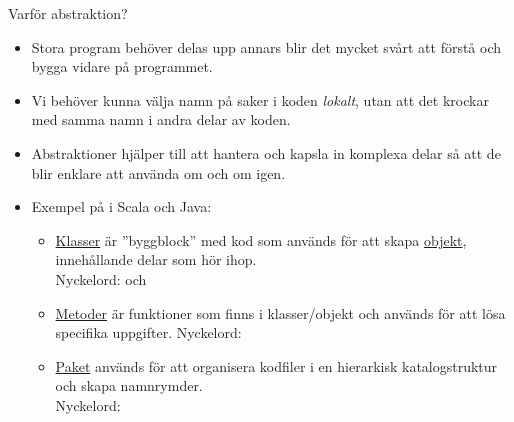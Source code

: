 \begin{Slide}{Varför abstraktion?}
\begin{itemize}
\item Stora program behöver delas upp annars blir det mycket svårt att förstå och bygga vidare på programmet.
\item Vi behöver kunna välja namn på saker i koden \textit{lokalt}, utan att det krockar med samma namn i andra delar av koden.
\item Abstraktioner hjälper till att hantera och kapsla in komplexa delar så att de blir enklare att använda om och om igen. 

\item Exempel på  i Scala och Java:
\begin{itemize}

\item \href{https://sv.wikipedia.org/wiki/Klass_\%28programmering\%29}{Klasser} är ''byggblock'' med kod som används för att skapa \href{https://sv.wikipedia.org/wiki/Objektorienterad_programmering\#Objekt}{objekt}, innehållande delar som hör ihop. \\ Nyckelord:  och  

\item \href{https://en.wikipedia.org/wiki/Method_\%28computer_programming\%29}{Metoder} är funktioner som finns i klasser/objekt och används för att lösa specifika uppgifter.  Nyckelord: 

\item \href{https://en.wikipedia.org/wiki/Java_package}{Paket} används för att organisera kodfiler i en hierarkisk katalogstruktur och skapa namnrymder. \\Nyckelord: 

\end{itemize}

\end{itemize}
\end{Slide}





